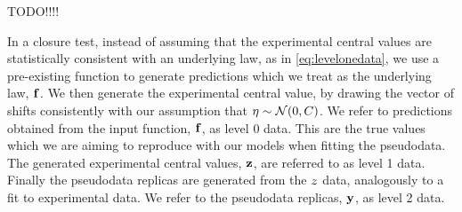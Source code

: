 TODO!!!!

In a closure test, instead of assuming that the experimental central values are
statistically consistent with an underlying law, as in \eqref{eq:levelonedata},
we use a pre-existing function to generate predictions which we treat as the
underlying law, $\mathbf{f}$. We then generate the experimental
central value, by drawing the vector of shifts consistently with our assumption
that $\mathbf{\eta} \sim \mathcal{N}(0, C)$. We refer to predictions obtained
from the input function, $\mathbf{f}$, as level 0 data. This are the true values
which we are aiming to reproduce with our models when fitting the pseudodata.
The generated
experimental central values, $\mathbf{z}$, are referred to as level 1 data.
Finally the pseudodata replicas are generated from the $z$ data,
analogously to a fit to experimental data. We refer to the pseudodata replicas,
$\mathbf{y}$, as level 2 data.

